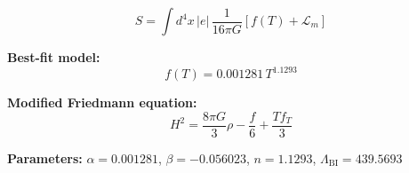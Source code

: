 
\begin{equation}
  S = \int d^4x \, |e| \, \frac{1}{16\pi G} \left[ f(T) + \mathcal{L}_m \right]
\end{equation}

\textbf{Best-fit model:}
\begin{equation}
  f(T) = 0.001281 \, T^{1.1293}
\end{equation}

\textbf{Modified Friedmann equation:}
\begin{equation}
  H^2 = \frac{8\pi G}{3} \rho - \frac{f}{6} + \frac{T f_T}{3}
\end{equation}

\textbf{Parameters:}
$\alpha = 0.001281$, \quad
$\beta = -0.056023$, \quad
$n = 1.1293$, \quad
$\Lambda_{\text{BI}} = 439.5693$